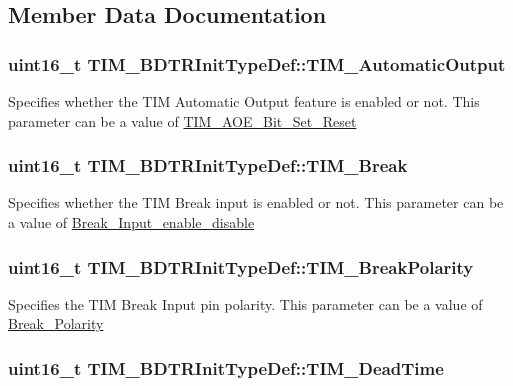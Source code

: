 \subsection{Member Data Documentation}
\hypertarget{structTIM__BDTRInitTypeDef_a6c056e29af67fd8a32919104ea48eea2}{
\subsubsection[{TIM\_\-AutomaticOutput}]{\setlength{\rightskip}{0pt plus 5cm}uint16\_\-t {\bf TIM\_\-BDTRInitTypeDef::TIM\_\-AutomaticOutput}}}
\label{structTIM__BDTRInitTypeDef_a6c056e29af67fd8a32919104ea48eea2}
Specifies whether the TIM Automatic Output feature is enabled or not. This parameter can be a value of \hyperlink{group__TIM__AOE__Bit__Set__Reset}{TIM\_\-AOE\_\-Bit\_\-Set\_\-Reset} \hypertarget{structTIM__BDTRInitTypeDef_a9fcf20632d0377727476a98f7183be56}{
\subsubsection[{TIM\_\-Break}]{\setlength{\rightskip}{0pt plus 5cm}uint16\_\-t {\bf TIM\_\-BDTRInitTypeDef::TIM\_\-Break}}}
\label{structTIM__BDTRInitTypeDef_a9fcf20632d0377727476a98f7183be56}
Specifies whether the TIM Break input is enabled or not. This parameter can be a value of \hyperlink{group__Break__Input__enable__disable}{Break\_\-Input\_\-enable\_\-disable} \hypertarget{structTIM__BDTRInitTypeDef_a5731e4e786b66f35cfe4798d6157619e}{
\subsubsection[{TIM\_\-BreakPolarity}]{\setlength{\rightskip}{0pt plus 5cm}uint16\_\-t {\bf TIM\_\-BDTRInitTypeDef::TIM\_\-BreakPolarity}}}
\label{structTIM__BDTRInitTypeDef_a5731e4e786b66f35cfe4798d6157619e}
Specifies the TIM Break Input pin polarity. This parameter can be a value of \hyperlink{group__Break__Polarity}{Break\_\-Polarity} \hypertarget{structTIM__BDTRInitTypeDef_a01ccbaffccdb3068b8a60c912579b1a2}{
\subsubsection[{TIM\_\-DeadTime}]{\setlength{\rightskip}{0pt plus 5cm}uint16\_\-t {\bf TIM\_\-BDTRInitTypeDef::TIM\_\-DeadTime}}}
